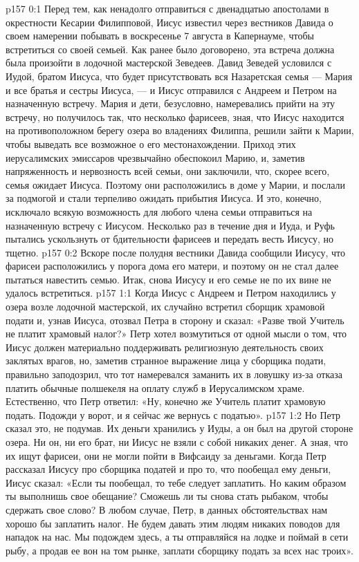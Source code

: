 \author{Комиссия срединников}
\vs p157 0:1 Перед тем, как ненадолго отправиться с двенадцатью апостолами в окрестности Кесарии Филипповой, Иисус известил через вестников Давида о своем намерении побывать в воскресенье 7 августа в Капернауме, чтобы встретиться со своей семьей. Как ранее было договорено, эта встреча должна была произойти в лодочной мастерской Зеведеев. Давид Зеведей условился с Иудой, братом Иисуса, что будет присутствовать вся Назаретская семья --- Мария и все братья и сестры Иисуса, --- и Иисус отправился с Андреем и Петром на назначенную встречу. Мария и дети, безусловно, намеревались прийти на эту встречу, но получилось так, что несколько фарисеев, зная, что Иисус находится на противоположном берегу озера во владениях Филиппа, решили зайти к Марии, чтобы выведать все возможное о его местонахождении. Приход этих иерусалимских эмиссаров чрезвычайно обеспокоил Марию, и, заметив напряженность и нервозность всей семьи, они заключили, что, скорее всего, семья ожидает Иисуса. Поэтому они расположились в доме у Марии, и послали за подмогой и стали терпеливо ожидать прибытия Иисуса. И это, конечно, исключало всякую возможность для любого члена семьи отправиться на назначенную встречу с Иисусом. Несколько раз в течение дня и Иуда, и Руфь пытались ускользнуть от бдительности фарисеев и передать весть Иисусу, но тщетно.
\vs p157 0:2 Вскоре после полудня вестники Давида сообщили Иисусу, что фарисеи расположились у порога дома его матери, и поэтому он не стал далее пытаться навестить семью. Итак, снова Иисусу и его семье не по их вине не удалось встретиться.
\vs p157 1:1 Когда Иисус с Андреем и Петром находились у озера возле лодочной мастерской, их случайно встретил сборщик храмовой подати и, узнав Иисуса, отозвал Петра в сторону и сказал: «Разве твой Учитель не платит храмовый налог?» Петр хотел возмутиться от одной мысли о том, что Иисус должен материально поддерживать религиозную деятельность своих заклятых врагов, но, заметив странное выражение лица у сборщика подати, правильно заподозрил, что тот намеревался заманить их в ловушку из\hyp{}за отказа платить обычные полшекеля на оплату служб в Иерусалимском храме. Естественно, что Петр ответил: «Ну, конечно же Учитель платит храмовую подать. Подожди у ворот, и я сейчас же вернусь с податью».
\vs p157 1:2 Но Петр сказал это, не подумав. Их деньги хранились у Иуды, а он был на другой стороне озера. Ни он, ни его брат, ни Иисус не взяли с собой никаких денег. А зная, что их ищут фарисеи, они не могли пойти в Вифсаиду за деньгами. Когда Петр рассказал Иисусу про сборщика податей и про то, что пообещал ему деньги, Иисус сказал: «Если ты пообещал, то тебе следует заплатить. Но каким образом ты выполнишь свое обещание? Сможешь ли ты снова стать рыбаком, чтобы сдержать свое слово? В любом случае, Петр, в данных обстоятельствах нам хорошо бы заплатить налог. Не будем давать этим людям никаких поводов для нападок на нас. Мы подождем здесь, а ты отправляйся на лодке и поймай в сети рыбу, а продав ее вон на том рынке, заплати сборщику подать за всех нас троих».
